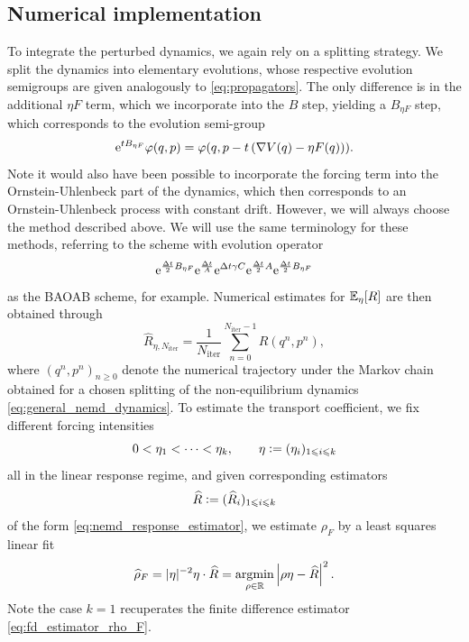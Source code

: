 \subsection{Numerical implementation}
To integrate the perturbed dynamics, we again rely on a splitting strategy.
We split the dynamics into elementary evolutions, whose respective evolution semigroups are given analogously to \eqref{eq:propagators}.
The only difference is in the additional $\eta F$ term, which we incorporate into the $B$ step, yielding a $B_{\eta F}$ step, which corresponds to the evolution semi-group
\begin{equation}
    \label{eq:B_etaF_step}
    \mathrm{e}^{tB_{\eta F}}\varphi(q,p)=\varphi(q,p-t\left(\nabla V(q)-\eta F(q)\right)).
\end{equation}
Note it would also have been possible to incorporate the forcing term into the Ornstein-Uhlenbeck part of the dynamics, which then corresponds to an Ornstein-Uhlenbeck process with constant drift.
However, we will always choose the method described above. We will use the same terminology for these methods, referring to the scheme with evolution operator
\begin{equation}
    \mathrm{e}^{\frac{{\Delta t}}2B_{\eta F}}\mathrm{e}^{\frac{{\Delta t}}A}\mathrm{e}^{{\Delta t}\gamma C}\mathrm{e}^{\frac{{\Delta t}}2A}\mathrm{e}^{\frac{{\Delta t}}2B_{\eta F}}
\end{equation}
as the BAOAB scheme, for example.
Numerical estimates for $\mathbb{E}_\eta[R]$ are then obtained through 
\begin{equation}
    \label{eq:nemd_response_estimator}
    \widehat{R}_{\eta,N_{\mathrm{iter}}}= \frac{1}{N_{\mathrm{iter}}}\sum_{n=0}^{N_\mathrm{iter}-1} R(q^n,p^n),
\end{equation}
where $(q^n,p^n)_{n\geq 0}$ denote the numerical trajectory under the Markov chain obtained for a chosen splitting of the non-equilibrium dynamics \eqref{eq:general_nemd_dynamics}.
To estimate the transport coefficient, we fix different forcing intensities
\[0<\eta_1<\dotsm<\eta_k,\qquad \eta\mathrel{\mathop:}= (\eta_i)_{1\leqslant i\leqslant k}\]
all in the linear response regime, and given corresponding estimators 
\[\widehat{R} \mathrel{\mathop:}= (\widehat{R}_i)_{1\leqslant i\leqslant k}\]
of the form \eqref{eq:nemd_response_estimator}, we estimate $\rho_F$ by a least squares linear fit 
\begin{equation}
    \label{eq:rho_F_nemd_estimator}
    \widehat{\rho}_F= |\eta|^{-2}\eta\cdot\widehat{R}= \underset{\rho \in \mathbb{R}}{\mathrm{argmin}} \left| \rho\eta - \widehat{R}\right|^2.
\end{equation}
Note the case $k=1$ recuperates the finite difference estimator \eqref{eq:fd_estimator_rho_F}.
